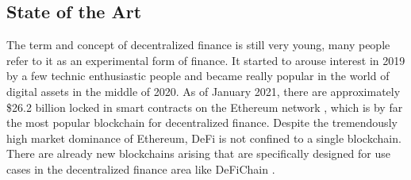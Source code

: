 \subsection{State of the Art}
The term and concept of decentralized finance is still very young, many people refer to it as an experimental form of finance. It started to arouse interest in 2019
by a few technic enthusiastic people and became really popular in the world of digital assets in the middle of 2020. As of January 2021, there are approximately
\$26.2 billion locked in smart contracts on the Ethereum network \cite{DeFiPulse}, which is by far the most popular blockchain for decentralized finance. Despite the
tremendously high market dominance of Ethereum, DeFi is not confined to a single blockchain. There are already new blockchains arising that are specifically designed
for use cases in the decentralized finance area like DeFiChain \cite{DeFiChain}.

